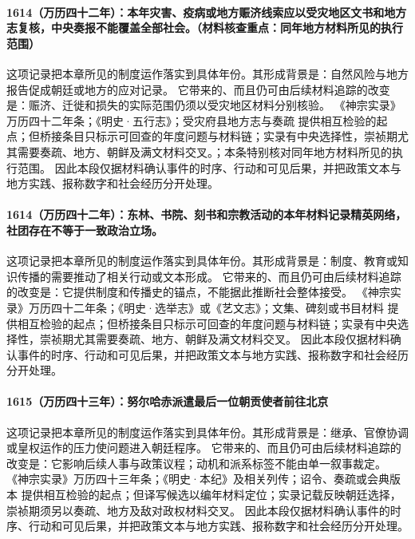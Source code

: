 \paragraph{1614（万历四十二年）：本年灾害、疫病或地方赈济线索应以受灾地区文书和地方志复核，中央奏报不能覆盖全部社会。（材料核查重点：同年地方材料所见的执行范围）} 这项记录把本章所见的制度运作落实到具体年份。其形成背景是：自然风险与地方报告促成朝廷或地方的应对记录。 它带来的、而且仍可由后续材料追踪的改变是：赈济、迁徙和损失的实际范围仍须以受灾地区材料分别核验。 《神宗实录》万历四十二年条；《明史·五行志》；受灾府县地方志与奏疏 提供相互检验的起点；但桥接条目只标示可回查的年度问题与材料链；实录有中央选择性，崇祯期尤其需要奏疏、地方、朝鲜及满文材料交叉。；本条特别核对同年地方材料所见的执行范围。 因此本段仅据材料确认事件的时序、行动和可见后果，并把政策文本与地方实践、报称数字和社会经历分开处理。

\paragraph{1614（万历四十二年）：东林、书院、刻书和宗教活动的本年材料记录精英网络，社团存在不等于一致政治立场。} 这项记录把本章所见的制度运作落实到具体年份。其形成背景是：制度、教育或知识传播的需要推动了相关行动或文本形成。 它带来的、而且仍可由后续材料追踪的改变是：它提供制度和传播史的锚点，不能据此推断社会整体接受。 《神宗实录》万历四十二年条；《明史·选举志》或《艺文志》；文集、碑刻或书目材料 提供相互检验的起点；但桥接条目只标示可回查的年度问题与材料链；实录有中央选择性，崇祯期尤其需要奏疏、地方、朝鲜及满文材料交叉。 因此本段仅据材料确认事件的时序、行动和可见后果，并把政策文本与地方实践、报称数字和社会经历分开处理。

\paragraph{1615（万历四十三年）：努尔哈赤派遣最后一位朝贡使者前往北京} 这项记录把本章所见的制度运作落实到具体年份。其形成背景是：继承、官僚协调或皇权运作的压力使问题进入朝廷程序。 它带来的、而且仍可由后续材料追踪的改变是：它影响后续人事与政策议程；动机和派系标签不能由单一叙事裁定。 《神宗实录》万历四十三年条；《明史·本纪》及相关列传；诏令、奏疏或会典版本 提供相互检验的起点；但译写候选以编年材料定位；实录记载反映朝廷选择，崇祯期须另以奏疏、地方及敌对政权材料交叉。 因此本段仅据材料确认事件的时序、行动和可见后果，并把政策文本与地方实践、报称数字和社会经历分开处理。

